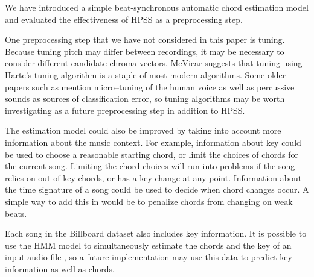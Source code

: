 \documentclass{article}
\begin{document}
We have introduced a simple beat-synchronous automatic chord estimation model
and evaluated the effectiveness of HPSS as a preprocessing step.

One preprocessing step that we have not considered in this paper is tuning.
Because tuning pitch may differ between recordings, it may be necessary to
consider different candidate chroma vectors. McVicar\cite{McVicar:00} suggests that
tuning using Harte's tuning algorithm is a staple of most modern algorithms.
Some older papers such as \cite{Zenz:20} mention micro--tuning of the human
voice as well as percussive sounds as sources of classification error, so
tuning algorithms may be worth investigating as a future preprocessing step in
addition to HPSS.

The estimation model could also be improved by taking into account more
information about the music context. For example, information about key could
be used to choose a reasonable starting chord, or limit the choices of chords
for the current song. Limiting the chord choices will run into problems if the
song relies on out of key chords, or has a key change at any point. Information
about the time signature of a song could be used to decide when chord changes
occur. A simple way to add this in would be to penalize chords from changing on
weak beats.

Each song in the Billboard dataset also includes key information. It is
possible to use the HMM model to simultaneously estimate the chords and the key
of an input audio file \cite{McVicar:00}, so a future implementation may use
this data to predict key information as well as chords.
\end{document}
